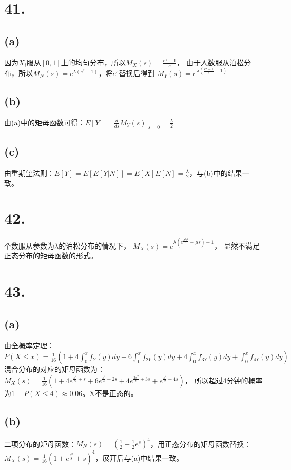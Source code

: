 \documentclass[UTF8]{report}
\begin{document}
    \section*{41.}
        \subsection*{(a)}
            因为$X_i$服从$[0, 1]$上的均匀分布，所以$M_X(s) = \frac{e^s - 1}{s}$，
            由于人数服从泊松分布，所以$M_N(s) = e^{\lambda(e^s - 1)}$，将$e^s$替换后得到
            $M_Y(s) = e^{\lambda(\frac{e^s - 1}{s} - 1)}$
        \subsection*{(b)}
            由(a)中的矩母函数可得：$E[Y] = \frac{d}{ds}M_Y(s)|_{s = 0} = \frac{\lambda}{2}$
        \subsection*{(c)}
            由重期望法则：$E[Y] = E[E[Y|N]] = E[X]E[N] = \frac{\lambda}{2}$，与(b)中的结果一致。
    \section*{42.}
        个数服从参数为$\lambda$的泊松分布的情况下，
        $M_X(s) = e^{\lambda(e^{\frac{\sigma^2s^2}{2}} + \mu s) - 1}$，
        显然不满足正态分布的矩母函数的形式。
    \section*{43.}
        \subsection*{(a)}
            由全概率定理：
            $P(X \leq x) =
            \frac{1}{16}(1 + 4\int_{0}^{x}f_Y(y)dy + 6\int_{0}^{x}f_{2Y}(y)dy + 4\int_{0}^{x}f_{3Y}(y)dy + \int_{0}^{x}f_{4Y}(y)dy)$
            混合分布的对应的矩母函数为：
            $M_X(s) = \frac{1}{16}(1 + 4e^{\frac{s^2}{8} + s} + 6e^{\frac{s^2}{4} + 2s} + 4e^{\frac{3s^2}{8} + 3s} + e^{\frac{s^2}{2} + 4s})$，
            所以超过4分钟的概率为$1 - P(X \leq 4) \approx 0.06$。X不是正态的。
        \subsection*{(b)}
            二项分布的矩母函数：$M_N(s) = (\frac{1}{2} + \frac{1}{2}e^s)^4$，用正态分布的矩母函数替换：
            $M_X(s) = \frac{1}{16}(1 + e^{\frac{s^2}{8}} + s)^4$，展开后与(a)中结果一致。
\end{document}
